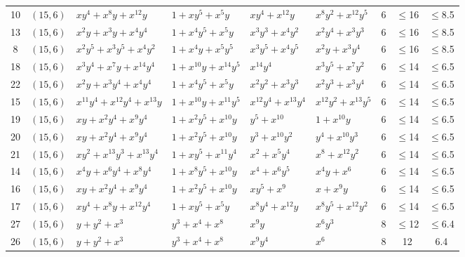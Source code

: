 \begin{table}[t]
\begin{tabular*}{\textwidth}{@{\extracolsep{\fill}}cllllllcc}
10 & $(15,6)$ & $xy^{4}{+}x^{8}y{+}x^{12}y$ & $1{+}xy^{5}{+}x^{5}y$ & $xy^{4}{+}x^{12}y$ & $x^{8}y^{2}{+}x^{12}y^{5}$ & 6 & $\leq$16 & $\leq$8.5 \\
13 & $(15,6)$ & $x^{2}y{+}x^{3}y{+}x^{4}y^{4}$ & $1{+}x^{4}y^{5}{+}x^{5}y$ & $x^{3}y^{3}{+}x^{4}y^{2}$ & $x^{2}y^{4}{+}x^{3}y^{3}$ & 6 & $\leq$16 & $\leq$8.5 \\
8 & $(15,6)$ & $x^{2}y^{5}{+}x^{3}y^{5}{+}x^{4}y^{2}$ & $1{+}x^{4}y{+}x^{5}y^{5}$ & $x^{3}y^{5}{+}x^{4}y^{5}$ & $x^{2}y{+}x^{3}y^{4}$ & 6 & $\leq$16 & $\leq$8.5 \\
18 & $(15,6)$ & $x^{3}y^{4}{+}x^{7}y{+}x^{14}y^{4}$ & $1{+}x^{10}y{+}x^{14}y^{5}$ & $x^{14}y^{4}$ & $x^{3}y^{5}{+}x^{7}y^{2}$ & 6 & $\leq$14 & $\leq$6.5 \\
22 & $(15,6)$ & $x^{2}y{+}x^{3}y^{4}{+}x^{4}y^{4}$ & $1{+}x^{4}y^{5}{+}x^{5}y$ & $x^{2}y^{2}{+}x^{3}y^{3}$ & $x^{2}y^{3}{+}x^{3}y^{4}$ & 6 & $\leq$14 & $\leq$6.5 \\
15 & $(15,6)$ & $x^{11}y^{4}{+}x^{12}y^{4}{+}x^{13}y$ & $1{+}x^{10}y{+}x^{11}y^{5}$ & $x^{12}y^{4}{+}x^{13}y^{4}$ & $x^{12}y^{2}{+}x^{13}y^{5}$ & 6 & $\leq$14 & $\leq$6.5 \\
19 & $(15,6)$ & $xy{+}x^{2}y^{4}{+}x^{9}y^{4}$ & $1{+}x^{2}y^{5}{+}x^{10}y$ & $y^{5}{+}x^{10}$ & $1{+}x^{10}y$ & 6 & $\leq$14 & $\leq$6.5 \\
20 & $(15,6)$ & $xy{+}x^{2}y^{4}{+}x^{9}y^{4}$ & $1{+}x^{2}y^{5}{+}x^{10}y$ & $y^{3}{+}x^{10}y^{2}$ & $y^{4}{+}x^{10}y^{3}$ & 6 & $\leq$14 & $\leq$6.5 \\
21 & $(15,6)$ & $xy^{2}{+}x^{13}y^{3}{+}x^{13}y^{4}$ & $1{+}xy^{5}{+}x^{11}y^{4}$ & $x^{2}{+}x^{5}y^{4}$ & $x^{8}{+}x^{12}y^{2}$ & 6 & $\leq$14 & $\leq$6.5 \\
14 & $(15,6)$ & $x^{4}y{+}x^{6}y^{4}{+}x^{8}y^{4}$ & $1{+}x^{8}y^{5}{+}x^{10}y$ & $x^{4}{+}x^{6}y^{5}$ & $x^{4}y{+}x^{6}$ & 6 & $\leq$14 & $\leq$6.5 \\
16 & $(15,6)$ & $xy{+}x^{2}y^{4}{+}x^{9}y^{4}$ & $1{+}x^{2}y^{5}{+}x^{10}y$ & $xy^{5}{+}x^{9}$ & $x{+}x^{9}y$ & 6 & $\leq$14 & $\leq$6.5 \\
17 & $(15,6)$ & $xy^{4}{+}x^{8}y{+}x^{12}y^{4}$ & $1{+}xy^{5}{+}x^{5}y$ & $x^{8}y^{4}{+}x^{12}y$ & $x^{8}y^{5}{+}x^{12}y^{2}$ & 6 & $\leq$14 & $\leq$6.5 \\
27 & $(15,6)$ & $y{+}y^{2}{+}x^{3}$ & $y^{3}{+}x^{4}{+}x^{8}$ & $x^{9}y$ & $x^{6}y^{3}$ & 8 & $\leq$12 & $\leq$6.4 \\
26 & $(15,6)$ & $y{+}y^{2}{+}x^{3}$ & $y^{3}{+}x^{4}{+}x^{8}$ & $x^{9}y^{4}$ & $x^{6}$ & 8 & 12 & 6.4 \\

\end{tabular*}
\end{table}
